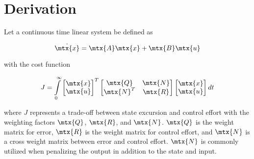 \section{Derivation}

Let a continuous time linear \gls{system} be defined as

\begin{equation}
  \dot{\mtx{x}} = \mtx{A}\mtx{x} + \mtx{B}\mtx{u}
\end{equation}

with the cost function

\begin{equation*}
  J = \int\limits_0^\infty
    \begin{bmatrix}
      \mtx{x} \\
      \mtx{u}
    \end{bmatrix}^T
    \begin{bmatrix}
      \mtx{Q} & \mtx{N} \\
      \mtx{N}^T & \mtx{R}
    \end{bmatrix}
    \begin{bmatrix}
      \mtx{x} \\
      \mtx{u}
    \end{bmatrix} dt
\end{equation*}

where $J$ represents a trade-off between \gls{state} excursion and
\gls{control effort} with the weighting factors $\mtx{Q}$, $\mtx{R}$, and
$\mtx{N}$. $\mtx{Q}$ is the weight matrix for \gls{error}, $\mtx{R}$ is the
weight matrix for \gls{control effort}, and $\mtx{N}$ is a cross weight matrix
between \gls{error} and \gls{control effort}. $\mtx{N}$ is commonly utilized
when penalizing the output in addition to the state and input.

